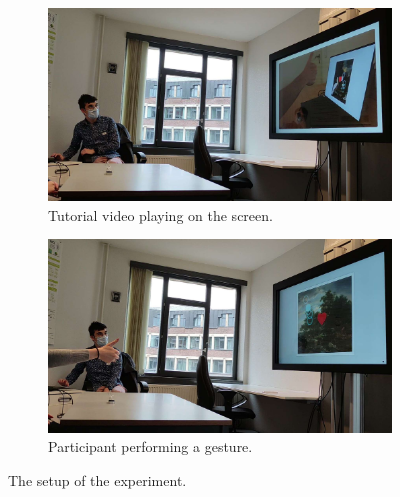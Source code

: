 \begin{figure}[h]
    \centering
    \begin{subfigure}{.495\textwidth}
        \centering
        \includegraphics[width=\linewidth,trim={75 0 35 0},clip]{Figures/LUI/Evaluation/experiment-tutorial.pdf}
        \vspace{-14pt}
        \captionsetup{width=.9\linewidth}
        \caption{Tutorial video playing on the screen.}
        \label{fig:lui:evaluation-apparatus-tutorial}
    \end{subfigure}
    \begin{subfigure}{.495\textwidth}
        \centering
        \includegraphics[width=\linewidth,trim={80 0 30 0},clip]{Figures/LUI/Evaluation/experiment-gesture.pdf} 
        \vspace{-14pt}
        \captionsetup{width=.9\linewidth}
        \caption{Participant performing a gesture.}
        \label{fig:lui:evaluation-apparatus-gesture}
    \end{subfigure}
    \vspace{-10pt}
    \caption{The setup of the experiment.}
    \label{fig:lui:evaluation-apparatus}
    \vspace{-8pt}
\end{figure}


